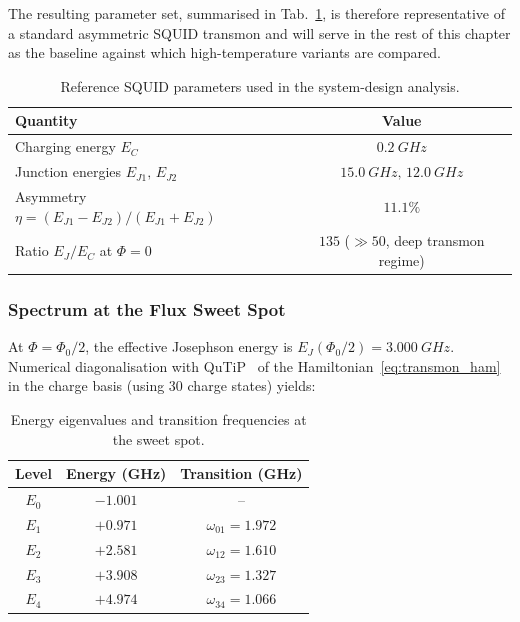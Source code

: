 The resulting parameter set, summarised in Tab.~\ref{tab:squid_design_params},
is therefore representative of a standard asymmetric SQUID transmon and
will serve in the rest of this chapter as the baseline against which
high-temperature variants are compared.

\begin{table}[h]
\centering
\begin{tabular}{@{}lc@{}}
\toprule
\textbf{Quantity} & \textbf{Value} \\
\midrule
Charging energy $E_C$                                       & $\SI{0.2}{GHz}$ \\
Junction energies $E_{J1},\,E_{J2}$                          & $\SI{15.0}{GHz},\,\SI{12.0}{GHz}$ \\
Asymmetry $\eta=(E_{J1}-E_{J2})/(E_{J1}+E_{J2})$            & $11.1\%$ \\
Ratio $E_J/E_C$ at $\Phi=0$                                  & $135$ ($\gg 50$, deep transmon regime) \\
\bottomrule
\end{tabular}
\caption{Reference SQUID parameters used in the system-design analysis.}
\label{tab:squid_design_params}
\end{table}

\subsubsection{Spectrum at the Flux Sweet Spot}

At $\Phi = \Phi_0/2$, the effective Josephson energy is $E_J(\Phi_0/2) = \SI{3.000}{GHz}$. Numerical diagonalisation with QuTiP~\cite{qutip5} of the Hamiltonian~\eqref{eq:transmon_ham} in the charge basis (using 30 charge states) yields:

\begin{table}[h]
\centering
\begin{tabular}{ccc}
\hline
Level & Energy (GHz) & Transition (GHz) \\
\hline
$E_0$ & $-1.001$ & -- \\
$E_1$ & $+0.971$ & $\omega_{01} = 1.972$ \\
$E_2$ & $+2.581$ & $\omega_{12} = 1.610$ \\
$E_3$ & $+3.908$ & $\omega_{23} = 1.327$ \\
$E_4$ & $+4.974$ & $\omega_{34} = 1.066$ \\
\hline
\end{tabular}
\caption{Energy eigenvalues and transition frequencies at the sweet spot.}
\label{tab:spectrum}
\end{table}


